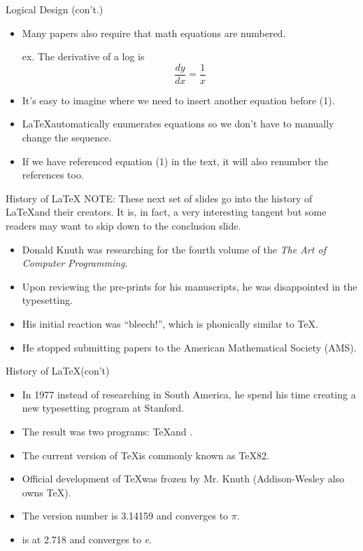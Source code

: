 \documentclass[pdf]{prosper}
\begin{document}
\begin{slide}{Logical Design (con't.)}
	\begin{itemize}
		\item Many papers also require that math equations are numbered.
\begin{center}
ex. The derivative of a log is\\
\begin{equation}
	\frac{dy}{dx}=\frac{1}{x}
\end{equation}
\end{center}
		\item It's easy to imagine where we need to insert another equation before (1).
		\item \LaTeX automatically enumerates equations so we don't have to manually change the sequence.
		\item If we have referenced equation (1) in the text, it will also renumber the references too.
	\end{itemize}
\end{slide}
\begin{slide}{History of \LaTeX}
NOTE: These next set of slides go into the history of \LaTeX and their creators. It is, in fact, a very interesting tangent but some readers may want to skip down to the conclusion slide.
	\begin{itemize}
		\item Donald Knuth was researching for the fourth volume of the \textit{The Art of Computer Programming}.
		\item Upon reviewing the pre-prints for his manuscripts, he was disappointed in the typesetting.
		\item His initial reaction was ``bleech!'', which is phonically similar to \TeX.
		\item He stopped submitting papers to the American Mathematical Society (AMS).
	\end{itemize}
\end{slide}
\begin{slide}{History of \LaTeX\mbox (con't)}
	\begin{itemize}
		\item In 1977 instead of researching in South America, he spend his time creating a new typesetting program at Stanford.
		\item The result was two programs: \TeX and \MF.
		\item The current version of \TeX is commonly known as \TeX82.
		\item Official development of \TeX was frozen by Mr. Knuth (Addison-Wesley also owns \TeX).
		\item The version number is 3.14159 and converges to $\pi$.
		\item \MF is at 2.718 and converges to \textit{e}.
	\end{itemize}
\end{slide}
\end{document}
